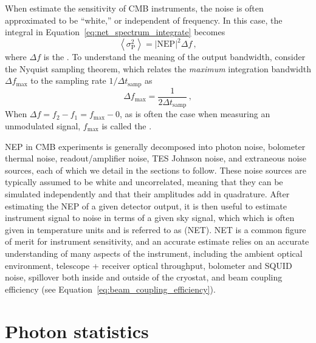 When estimate the sensitivity of CMB instruments, the noise is often approximated to be ``white,'' or independent of frequency. In this case, the integral in Equation~\ref{eq:net_spectrum_integrate} becomes
\begin{equation}
    \left< \sigma_{\mathrm{P}}^{2} \right> = \left| \mathrm{NEP}\right|^{2} \Delta f \, ,
    \label{eq:net_white_spectrum}
\end{equation}
where $\Delta f$ is the . To understand the meaning of the output bandwidth, consider the Nyquist sampling theorem, which relates the \textit{maximum} integration bandwidth $\Delta f_{\mathrm{max}}$ to the sampling rate $1 / \Delta t_{\mathrm{samp}}$ as
\begin{equation}
    \Delta f_{\mathrm{max}} = \frac{1}{2 \Delta t_{\mathrm{samp}}} \, ,
    \label{eq:output_bandwidth_nyquist_frequency}
\end{equation}
When $\Delta f = f_{2} - f_{1} = f_{\max} - 0$, as is often the case when measuring an unmodulated signal, $f_{\mathrm{max}}$ is called the .

NEP in CMB experiments is generally decomposed into photon noise, bolometer thermal noise, readout/amplifier noise, TES Johnson noise, and extraneous noise sources, each of which we detail in the sections to follow. These noise sources are typically assumed to be white and uncorrelated, meaning that they can be simulated independently and that their amplitudes add in quadrature. After estimating the NEP of a given detector output, it is then useful to estimate instrument signal to noise in terms of a given sky signal, which which is often given in temperature units and is referred to as  (NET). NET is a common figure of merit for instrument sensitivity, and an accurate estimate relies on an accurate understanding of many aspects of the instrument, including the ambient optical environment, telescope + receiver optical throughput, bolometer and SQUID noise, spillover both inside and outside of the cryostat, and beam coupling efficiency (see Equation~\ref{eq:beam_coupling_efficiency}).


\section{Photon statistics}
\label{sec:sensitivity_photon_statistics}

